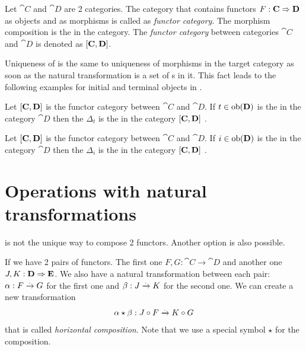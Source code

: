 \begin{definition}
\label{def:funcategory}
Let $\cat{C}$ and $\cat{D}$ are 2 categories. The category that
contains functors $F: \mathbf{C} \Rightarrow \mathbf{D}$ as objects and
 as morphisms is called as \textit{functor
  category}. The morphism composition is the
 in the category.  The \textit{functor
category} between categories $\cat{C}$ and $\cat{D}$ is denoted as
$[\mathbf{C}, \mathbf{D}]$. 
\end{definition}

Uniqueness of  is the same to uniqueness of morphisms in the
target category as soon as the natural transformation is a set of
s in it. This fact leads to the following
examples for initial and terminal objects in .

\begin{example}
  \label{ex:terminal_object_fun}
  Let $[\mathbf{C}, \mathbf{D}]$ is the functor category between $\cat{C}$
  and $\cat{D}$. If $t \in \mathrm{ob}(\mathbf{D})$ is the
   in the category $\cat{D}$ then 
  the 
   $\Delta_t$ is the
   in the category $[\mathbf{C}, \mathbf{D}]$
  \cite{bib:stackexchange:initial_terminal_in_fun_category}. 
\end{example}

\begin{example}
  \label{ex:initial_object_fun}
  Let $[\mathbf{C}, \mathbf{D}]$ is the functor category between $\cat{C}$
  and $\cat{D}$. If $i \in \mathrm{ob}(\mathbf{D})$ is the
   in the category $\cat{D}$ then 
  the 
   $\Delta_i$ is the
   in the category $[\mathbf{C}, \mathbf{D}]$
  \cite{bib:stackexchange:initial_terminal_in_fun_category}. 
\end{example}


\section{Operations with natural transformations}

 is not the unique way to compose
2 functors. Another option is also possible. 

\begin{definition}
\label{def:horizontal_composition}
If we have 2 pairs of functors. The first one $F,G: \cat{C} \to
\cat{D}$ and another one $J,K: \mathbf{D} \Rightarrow \mathbf{E}$. We also have a
natural transformation between each pair: $\alpha : F \xrightarrow{.}
G$ for the first one and $\beta : J \xrightarrow{.}
K$ for the second one. We can create a new transformation
\[
\alpha \star \beta: J \circ F \xrightarrow{.} K \circ G
\] 
that is called \textit{horizontal composition}. Note that we use a
special symbol $\star$ for the composition.
\end{definition}


